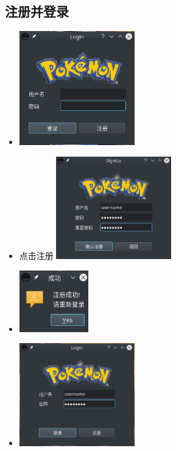 \documentclass{article}
\begin{document}
\subsection{注册并登录}

\begin{itemize}
\item \includegraphics[width=5cm]{./pokemon/登录.png}
\item 点击注册
  \includegraphics[width=5cm]{./pokemon/注册.png}
\item \includegraphics[width=3cm]{./pokemon/注册成功.png}
\item \includegraphics[width=5cm]{./pokemon/登录刚注册的.png}
\end{itemize}
\end{document}
